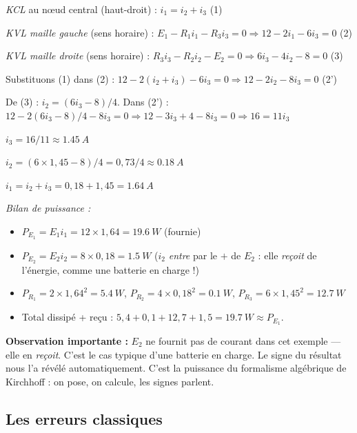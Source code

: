 \documentclass[12pt,a4paper,twoside]{book}
\begin{document}
\textit{KCL} au n\oe ud central (haut-droit) : $i_1 = i_2 + i_3$ \quad (1)

\textit{KVL maille gauche} (sens horaire) : $E_1 - R_1 i_1 - R_3 i_3 = 0 \Rightarrow 12 - 2i_1 - 6i_3 = 0$ \quad (2)

\textit{KVL maille droite} (sens horaire) : $R_3 i_3 - R_2 i_2 - E_2 = 0 \Rightarrow 6i_3 - 4i_2 - 8 = 0$ \quad (3)

Substituons (1) dans (2) : $12 - 2(i_2 + i_3) - 6i_3 = 0 \Rightarrow 12 - 2i_2 - 8i_3 = 0$ \quad (2')

De (3) : $i_2 = (6i_3 - 8)/4$. Dans (2') :
$12 - 2(6i_3-8)/4 - 8i_3 = 0 \Rightarrow 12 - 3i_3 + 4 - 8i_3 = 0 \Rightarrow 16 = 11i_3$

$i_3 = 16/11 \approx \SI{1.45}{A}$

$i_2 = (6\times1{,}45 - 8)/4 = 0{,}73/4 \approx \SI{0.18}{A}$

$i_1 = i_2 + i_3 = 0{,}18 + 1{,}45 = \SI{1.64}{A}$

\textit{Bilan de puissance :}
\begin{itemize}[nosep]
\item $P_{E_1} = E_1 i_1 = 12\times1{,}64 = \SI{19.6}{W}$ (fournie)
\item $P_{E_2} = E_2 i_2 = 8\times0{,}18 = \SI{1.5}{W}$ ($i_2$ \textit{entre} par le $+$ de $E_2$ : elle \textit{reçoit} de l'énergie, comme une batterie en charge !)
\item $P_{R_1} = 2\times1{,}64^2 = \SI{5.4}{W}$, $P_{R_2} = 4\times0{,}18^2 = \SI{0.1}{W}$, $P_{R_3} = 6\times1{,}45^2 = \SI{12.7}{W}$
\item Total dissipé + reçu : $5{,}4+0{,}1+12{,}7+1{,}5 = \SI{19.7}{W} \approx P_{E_1}$. \checkmark
\end{itemize}

\begin{attention}
\textbf{Observation importante :} $E_2$ ne fournit pas de courant dans cet exemple --- elle en \textit{reçoit}. C'est le cas typique d'une batterie en charge. Le signe du résultat nous l'a révélé automatiquement. C'est la puissance du formalisme algébrique de Kirchhoff : on pose, on calcule, les signes parlent.
\end{attention}

\subsection{Les erreurs classiques}
\end{document}
